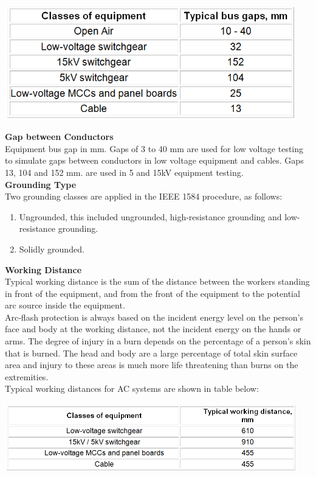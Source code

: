 \begin{center}
\includegraphics[width=5in, keepaspectratio=true]{../Images/Gaps.png} \\
\end{center}

\noindent\textbf{Gap between Conductors } \\  
\noindent Equipment bus gap in mm. Gaps of 3 to 40 mm are used for low voltage testing to simulate gaps between conductors in low voltage equipment and cables. Gaps 13, 104 and 152 mm. are used in 5 and 15kV equipment testing.\\
   
\noindent\textbf{Grounding Type}    \\
\noindent Two grounding classes are applied in the IEEE 1584 procedure, as follows:
\begin{enumerate}
	\item Ungrounded, this included ungrounded, high-resistance grounding and low-resistance grounding.
	\item Solidly grounded. 
\end{enumerate}

\noindent\textbf{Working Distance }  \\ 
\noindent Typical working distance is the sum of the distance between the workers standing in front of the equipment, and from the front of the equipment to the potential arc source inside the equipment. \\

\noindent Arc-flash protection is always based on the incident energy level on the person's face and body at the working distance, not the incident energy on the hands or arms. The degree of injury in a burn depends on the percentage of a person's skin that is burned. The head and body are a large percentage of total skin surface area and injury to these areas is much more life threatening than burns on the extremities. \\

\noindent Typical working distances for AC systems are shown in table below:
\begin{center}
\includegraphics[width=5in, keepaspectratio=true]{../Images/WorkingDistance.png} \\
\end{center}

